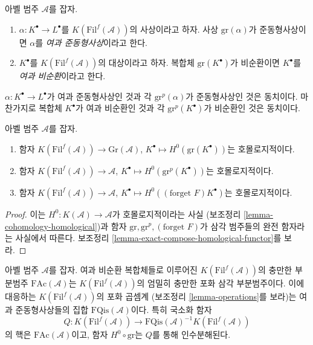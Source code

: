 \begin{definition}
\label{definition-filtered-acyclic}
아벨 범주 $\mathcal{A}$를 잡자.
\begin{enumerate}
\item $\alpha : K^\bullet \to L^\bullet$를
$K(\text{Fil}^f(\mathcal{A}))$의 사상이라고 하자.
사상 $\text{gr}(\alpha)$가 준동형사상이면 $\alpha$를
{\it 여과 준동형사상}이라고 한다.
\item $K^\bullet$를 $K(\text{Fil}^f(\mathcal{A}))$의 대상이라고 하자.
복합체 $\text{gr}(K^\bullet)$가 비순환이면 $K^\bullet$를
{\it 여과 비순환}이라고 한다.
\end{enumerate}
\end{definition}

\noindent
$\alpha : K^\bullet \to L^\bullet$가 여과 준동형사상인 것과 각
$\text{gr}^p(\alpha)$가 준동형사상인 것은 동치이다. 마찬가지로 복합체
$K^\bullet$가 여과 비순환인 것과 각 $\text{gr}^p(K^\bullet)$가
비순환인 것은 동치이다.

\begin{lemma}
\label{lemma-filtered-cohomology-homological}
아벨 범주 $\mathcal{A}$를 잡자.
\begin{enumerate}
\item 함자
$K(\text{Fil}^f(\mathcal{A})) \longrightarrow \text{Gr}(\mathcal{A})$,
$K^\bullet \longmapsto H^0(\text{gr}(K^\bullet))$는 호몰로지적이다.
\item 함자
$K(\text{Fil}^f(\mathcal{A})) \rightarrow \mathcal{A}$,
$K^\bullet \longmapsto H^0(\text{gr}^p(K^\bullet))$는 호몰로지적이다.
\item 함자
$K(\text{Fil}^f(\mathcal{A})) \longrightarrow \mathcal{A}$,
$K^\bullet \longmapsto H^0((\text{forget }F)K^\bullet)$는
호몰로지적이다.
\end{enumerate}
\end{lemma}

\begin{proof}
이는 $H^0 : K(\mathcal{A}) \to \mathcal{A}$가 호몰로지적이라는 사실
(보조정리 \ref{lemma-cohomology-homological})과 함자
$\text{gr}, \text{gr}^p, (\text{forget }F)$가 삼각 범주들의 완전
함자라는 사실에서 따른다. 보조정리
\ref{lemma-exact-compose-homological-functor}를 보라.
\end{proof}

\begin{lemma}
\label{lemma-filtered-acyclic}
아벨 범주 $\mathcal{A}$를 잡자. 여과 비순환 복합체들로 이루어진
$K(\text{Fil}^f(\mathcal{A}))$의 충만한 부분범주
$\text{FAc}(\mathcal{A})$는 $K(\text{Fil}^f(\mathcal{A}))$의 엄밀히
충만한 포화 삼각 부분범주이다. 이에 대응하는
$K(\text{Fil}^f(\mathcal{A}))$의 포화 곱셈계
(보조정리 \ref{lemma-operations}를 보라)는 여과 준동형사상들의 집합
$\text{FQis}(\mathcal{A})$이다. 특히 국소화 함자
$$
Q :
K(\text{Fil}^f(\mathcal{A}))
\longrightarrow
\text{FQis}(\mathcal{A})^{-1}K(\text{Fil}^f(\mathcal{A}))
$$
의 핵은 $\text{FAc}(\mathcal{A})$이고, 함자 $H^0 \circ \text{gr}$는
$Q$를 통해 인수분해된다.
\end{lemma}

